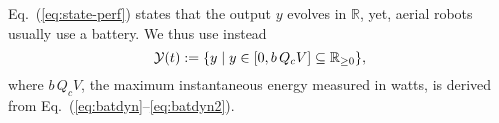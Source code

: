 \documentclass[letterpaper,10pt,journal,twoside]{IEEEtran}
\theoremstyle{definition}
\newtheorem{defn}{Definition}[section]
\begin{document}

Eq.~(\ref{eq:state-perf}) states that the output $y$ evolves in $\mathbb{R}$, %
yet, aerial robots usually use a battery.
We thus use instead
\begin{equation}\label{eq:output-const}
  {\small\mathcal{Y}(t):=\{y\mid y\in[0,b\,Q_cV]\subseteq{\mathbb{R}_{\geq 0}}\},} 
\end{equation}
where $b\,Q_cV$, the maximum instantaneous energy %
measured in watts, is derived from Eq.~(\ref{eq:batdyn}--\ref{eq:batdyn2}).



\end{document}
